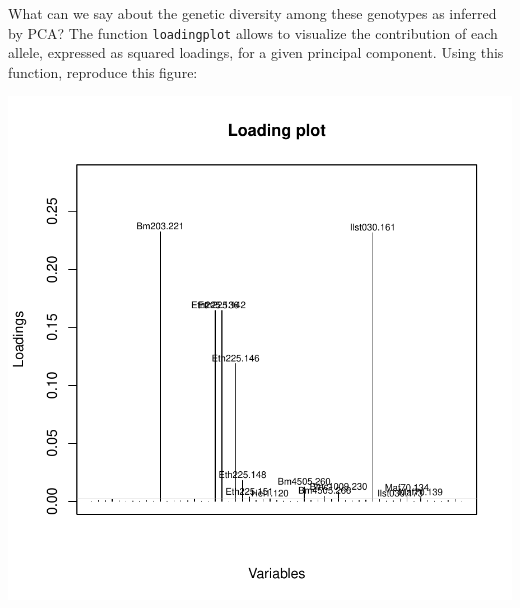 \documentclass{article}
\begin{document}
What can we say about the genetic diversity among these genotypes as
inferred by PCA?
The function \texttt{loadingplot} allows to visualize the contribution
of each allele, expressed as squared loadings, for a given principal component.
Using this function, reproduce this figure:
\begin{Schunk}
\end{Schunk}
\includegraphics{figs/spca-030}
\end{document}
